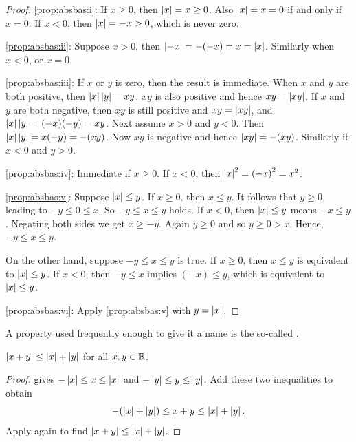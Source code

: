 \begin{proof}
\ref{prop:absbas:i}:
If $x \geq 0$, then $\left\lvert {x} \right\rvert = x \geq 0$.  Also $\left\lvert {x} \right\rvert = x = 0$ if and only
if $x=0$.
If $x < 0$, then $\left\lvert {x} \right\rvert = -x > 0$, which is never zero.

\medskip

\ref{prop:absbas:ii}: Suppose $x > 0$, then $\left\lvert {-x} \right\rvert = -(-x) = x =
\left\lvert {x} \right\rvert$.  Similarly when $x < 0$, or $x = 0$.

\medskip

\ref{prop:absbas:iii}:
If $x$ or $y$ is zero, then the result is immediate.  When $x$ and
$y$ are both positive, then $\left\lvert {x} \right\rvert\left\lvert {y} \right\rvert = xy$.  $xy$ is also positive
and hence $xy = \left\lvert {xy} \right\rvert$.  If $x$ and $y$ are both negative,
then $xy$ is still positive and $xy = \left\lvert {xy} \right\rvert$, and
$\left\lvert {x} \right\rvert\left\lvert {y} \right\rvert = (-x)(-y) = xy$.
Next assume
$x > 0$ and $y < 0$.  Then $\left\lvert {x} \right\rvert\left\lvert {y} \right\rvert = x(-y) = -(xy)$.  Now
$xy$ is negative and hence $\left\lvert {xy} \right\rvert = -(xy)$.  Similarly if
$x < 0$ and $y > 0$.

\medskip

\ref{prop:absbas:iv}:
Immediate if $x \geq 0$.  If $x < 0$, then $\left\lvert {x} \right\rvert^2 = {(-x)}^2 =
x^2$.

\medskip

\ref{prop:absbas:v}:  Suppose $\left\lvert {x} \right\rvert \leq y$.  If $x \geq 0$,
then $x \leq y$.  It follows that $y \geq 0$, leading to $-y \leq 0 \leq x$.  So $-y \leq x \leq y$
holds.  If $x < 0$, then $\left\lvert {x} \right\rvert \leq y$ means $-x \leq y$.  Negating both
sides we get $x \geq -y$.  Again $y \geq 0$ and so $y \geq 0 > x$.
Hence, $-y \leq x \leq y$.

On the other hand, suppose 
$-y \leq x \leq y$ is true.  If $x \geq 0$, then $x \leq y$ is equivalent
to $\left\lvert {x} \right\rvert \leq y$.  If $x < 0$, then $-y \leq x$ implies
$(-x) \leq y$, which is equivalent to $\left\lvert {x} \right\rvert \leq y$.

\medskip

\ref{prop:absbas:vi}:  Apply \ref{prop:absbas:v} with $y = \left\lvert {x} \right\rvert$.
\end{proof}

A property used frequently enough to give it a name is the so-called
\emph{}.

\begin{prop}
$\left\lvert {x+y} \right\rvert \leq \left\lvert {x} \right\rvert+\left\lvert {y} \right\rvert$
for all $x, y \in {\mathbb{R}}$.
\end{prop}

\begin{proof}
 gives
$- \left\lvert {x} \right\rvert \leq x \leq \left\lvert {x} \right\rvert$ and
$- \left\lvert {y} \right\rvert \leq y \leq \left\lvert {y} \right\rvert$.  Add these two inequalities to obtain
\begin{equation*}
- (\left\lvert {x} \right\rvert+\left\lvert {y} \right\rvert) \leq x+y \leq \left\lvert {x} \right\rvert+ \left\lvert {y} \right\rvert .
\end{equation*}
Apply  again to find
$\left\lvert {x+y} \right\rvert \leq \left\lvert {x} \right\rvert+\left\lvert {y} \right\rvert$.
\end{proof}

